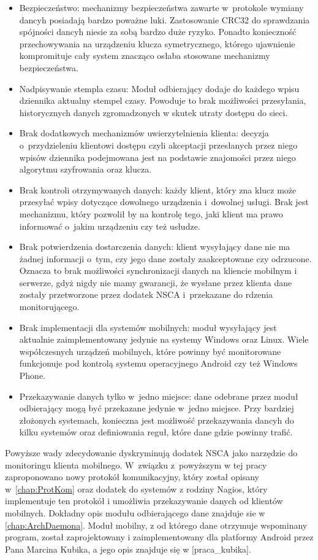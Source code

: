 \begin{itemize}
\item Bezpieczeństwo: mechanizmy bezpieczeństwa zawarte w~protokole
  wymiany dancyh posiadają bardzo poważne luki. Zastosowanie CRC32 do
  sprawdzania spójności dancyh niesie za sobą bardzo duże
  ryzyko. Ponadto konieczność przechowywania na urządzeniu klucza
  symetrycznego, którego ujawnienie kompromituje cały system znacząco osłaba
  stosowane mechanizmy bezpieczeństwa.
\item Nadpisywanie stempla czasu: Moduł odbierający dodaje do każdego
  wpisu dziennika aktualny stempel czasy. Powoduje to brak możliwości
  przesyłania, historycznych danych zgromadzonych w skutek utraty
  dostępu do sieci.
\item Brak dodatkowych mechanizmów uwierzytelnienia klienta: decyzja
  o~przydzieleniu klientowi dostępu czyli akceptacji przesłanych przez
  niego wpisów dziennika podejmowana jest na podstawie znajomości
  przez niego algorytmu szyfrowania oraz klucza.
\item Brak kontroli otrzymywanych danych: każdy klient, który zna
  klucz może przesyłać wpisy dotyczące dowolnego urządzenia i~dowolnej
  usługi. Brak jest mechanizmu, który pozwolił by na kontrolę tego,
  jaki klient ma prawo informować o~jakim urządzeniu czy też usłudze.
\item Brak potwierdzenia dostarczenia danych: klient wysyłający dane
  nie ma żadnej informacji o~tym, czy jego dane zostały zaakceptowane
  czy odrzucone. Oznacza to brak możliwości synchronizacji danych na
  kliencie mobilnym i serwerze, gdyż nigdy nie mamy gwarancji, że
  wysłane przez klienta dane zostały przetworzone przez dodatek NSCA
  i~przekazane do rdzenia monitorującego.
\item Brak implementacji dla systemów mobilnych: moduł wysyłający jest
  aktualnie zaimplementowany jedynie na systemy Windows oraz
  Linux. Wiele współczesnych urządzeń mobilnych, które powinny być
  monitorowane funkcjonuje pod kontrolą systemu operacyjnego Android
  czy też Windows Phone.
\item Przekazywanie danych tylko w~jedno miejsce: dane odebrane przez
  moduł odbierający mogą być przekazane jedynie w~jedno miejsce. Przy
  bardziej złożonych systemach, konieczna jest możliwość przekazywania
  dancyh do kilku systemów oraz definiowania reguł, które dane gdzie
  powinny trafić.
\end{itemize}

Powyższe wady zdecydowanie dyskryminują dodatek NSCA jako narzędzie do
monitoringu klienta mobilnego. W~związku z~powyższym w tej pracy
zaproponowano nowy protokół komunikacyjny, który został opisany
w~\ref{chap:ProtKom} oraz dodatek do systemów z rodziny Nagios, który
implementuje ten protokół i umożliwia przekazywanie danych od klientów
mobilnych. Dokładny opis modułu odbierającego dane znajduje sie w
\ref{chap:ArchDaemona}. Moduł mobilny, z od którego dane otrzymuje
wspominany program, został zaprojektowany i zaimplementowany dla
platformy Android przez Pana Marcina Kubika, a jego opis znajduje się
w [praca\_kubika].
